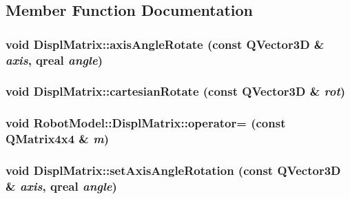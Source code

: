 \subsection{Member Function Documentation}
\hypertarget{class_robot_model_1_1_displ_matrix_aaf591b95247e1a80332ba0033427af7e}{
\subsubsection[{axisAngleRotate}]{\setlength{\rightskip}{0pt plus 5cm}void DisplMatrix::axisAngleRotate (const QVector3D \& {\em axis}, \/  qreal {\em angle})}}
\label{class_robot_model_1_1_displ_matrix_aaf591b95247e1a80332ba0033427af7e}
\hypertarget{class_robot_model_1_1_displ_matrix_a337c49b52435255a7f36966c7047f6ff}{
\subsubsection[{cartesianRotate}]{\setlength{\rightskip}{0pt plus 5cm}void DisplMatrix::cartesianRotate (const QVector3D \& {\em rot})}}
\label{class_robot_model_1_1_displ_matrix_a337c49b52435255a7f36966c7047f6ff}
\hypertarget{class_robot_model_1_1_displ_matrix_a3baf235c0c2c7eee46506dc2b2114fe2}{
\subsubsection[{operator=}]{\setlength{\rightskip}{0pt plus 5cm}void RobotModel::DisplMatrix::operator= (const QMatrix4x4 \& {\em m})}}
\label{class_robot_model_1_1_displ_matrix_a3baf235c0c2c7eee46506dc2b2114fe2}
\hypertarget{class_robot_model_1_1_displ_matrix_ab976907c6be66c0aee20a24991ce4159}{
\subsubsection[{setAxisAngleRotation}]{\setlength{\rightskip}{0pt plus 5cm}void DisplMatrix::setAxisAngleRotation (const QVector3D \& {\em axis}, \/  qreal {\em angle})}}
